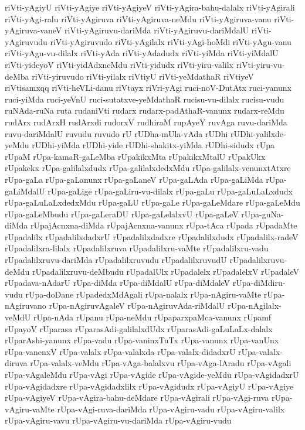 {riVti-yAgiyU
riVti-yAgiye
riVti-yAgiyeV
riVti-yAgira-bahu-dalalx
riVti-yAgirali
riVti-yAgi-ralu
riVti-yAgiruva
riVti-yAgiruva-neMdu
riVti-yAgiruva-vanu
riVti-yAgiruva-vaneV
riVti-yAgiruvu-dariMda
riVti-yAgiruvu-dariMdalU
riVti-yAgiruvudu
riVti-yAgiruvudo
riVti-yAgilalx
riVti-yAgi-hoMdi
riVti-yAgu-vanu
riVti-yAgu-vu-dilalx
riVti-yAda
riVti-yAdadudx
riVti-yiMda
riVti-yiMdalU
riVti-yideyoV
riVti-yidAdxneMdu
riVti-yidudx
riVti-yiru-valilx
riVti-yiru-vu-deMba
riVti-yiruvudo
riVti-yilalx
riVtiyU
riVti-yeMdathaR
riVtiyeV
riVtisamxqq
riVti-heVLi-danu
riVtayx
riVri-yAgi
ruci-noV-DutAtx
ruci-yanunx
ruci-yiMda
ruci-yeVnU
ruci-sutatxve-yeMdathaR
rucisu-vu-dilalx
rucisu-vudu
ruNAda-ruNa
ruta
rudaniVti
rudarx
rudarx-padAthaR-vanunx
rudarx-reMdu
rudArx
rudArxH
rudArxdi
rudorxV
rudhiraM
rupAyeY
ruvAga
ruvu-dariMda
ruvu-dariMdalU
ruvudu
ruvudo
rU
rUDha-mUla-vAda
rUDhi
rUDhi-yalilxde-yeMdu
rUDhi-yiMda
rUDhi-yide
rUDhi-shakitx-yiMda
rUDhi-sidudx
rUpa
rUpaM
rUpa-kamaR-gaLeMba
rUpakikxMta
rUpakikxMtalU
rUpakUkx
rUpakekx
rUpa-galilalxdudx
rUpa-galilalxdedxMdu
rUpa-galilalx-venunxtAtxre
rUpa-gaLa
rUpa-gaLanunx
rUpa-gaLaneV
rUpa-gaLAda
rUpa-gaLiMda
rUpa-gaLiMdalU
rUpa-gaLige
rUpa-gaLiru-vu-dilalx
rUpa-gaLu
rUpa-gaLuLaLxdudx
rUpa-gaLuLaLxdedxMdu
rUpa-gaLU
rUpa-gaLe
rUpa-gaLeMdare
rUpa-gaLeMdu
rUpa-gaLeMbudu
rUpa-gaLeraDU
rUpa-gaLelalxvU
rUpa-gaLeV
rUpa-guNa-diMda
rUpajAcnxna-diMda
rUpajAcnxna-vanunx
rUpa-tAca
rUpada
rUpadaMte
rUpadalilx
rUpadalilxdadxrU
rUpadalilxdadxre
rUpadalilxdudx
rUpadalilx-radeV
rUpadalilxra-lilalx
rUpadalilxruva
rUpadalilxru-vaMte
rUpadalilxru-vadu
rUpadalilxruvu-dariMda
rUpadalilxruvudu
rUpadalilxruvudU
rUpadalilxruvu-deMdu
rUpadalilxruvu-deMbudu
rUpadalUlx
rUpadalelx
rUpadalelxV
rUpadaleV
rUpadava-nAdarU
rUpa-diMda
rUpa-diMdalU
rUpa-diMdaleV
rUpa-diMdiru-vudu
rUpa-doDane
rUpadedxMdAgali
rUpa-nalalx
rUpa-nAgiru-vaMte
rUpa-nAgiruvano
rUpa-nAgiruvAgaleV
rUpa-nAgiruvAda-riMdalU
rUpa-nAgilalx-veMdU
rUpa-nAda
rUpanu
rUpa-neMdu
rUpaparxpaMca-vanunx
rUpamf
rUpayoV
rUparasa
rUparasAdi-galilalxdUdx
rUparasAdi-gaLuLaLx-dalalx
rUparAshi-yanunx
rUpa-vadu
rUpa-vaninxTuTx
rUpa-vanunx
rUpa-vanUnx
rUpa-vanenxV
rUpa-valalx
rUpa-valalxda
rUpa-valalx-didadxrU
rUpa-valalx-diruva
rUpa-valalx-veMdu
rUpa-vAga-balalxvu
rUpa-vAga-lAradu
rUpa-vAgali
rUpa-vAgaleMdu
rUpa-vAgi
rUpa-vAgide
rUpa-vAgide-yeMdu
rUpa-vAgidadxrU
rUpa-vAgidadxre
rUpa-vAgidadxlilx
rUpa-vAgidudx
rUpa-vAgiyU
rUpa-vAgiye
rUpa-vAgiyeV
rUpa-vAgira-bahu-deMdare
rUpa-vAgirali
rUpa-vAgi-ruva
rUpa-vAgiru-vaMte
rUpa-vAgi-ruva-dariMda
rUpa-vAgiru-vadu
rUpa-vAgiru-valilx
rUpa-vAgiru-vavu
rUpa-vAgiru-vu-dariMda
rUpa-vAgiru-vudu
}
